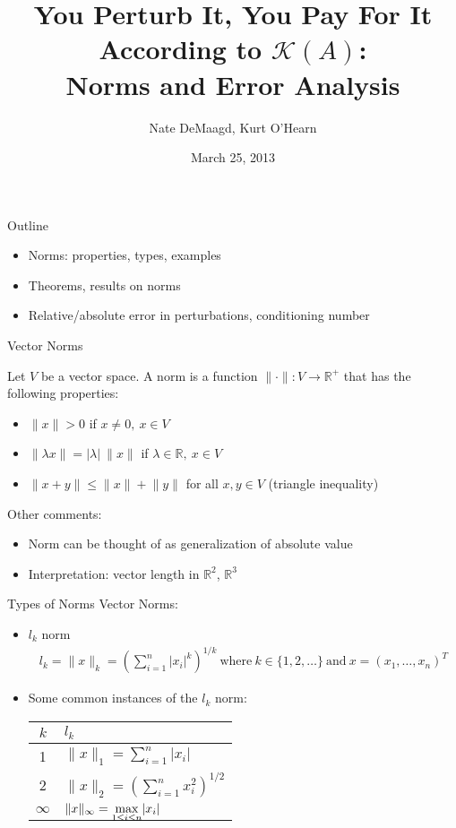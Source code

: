 \documentclass[9pt, serif]{beamer}
\title[Norms and Error Analysis]
{You Perturb It, You Pay For It According to $\mathcal{K}(A)$:\\Norms and Error Analysis}
\author[]
{Nate DeMaagd, Kurt O'Hearn}
\institute[Grand Valley State University]
{MTH 499-02}
\date{March 25, 2013}
\newlength{\wideitemsep}
\let\olditem\item
\renewcommand{\item}{\setlength{\itemsep}{\wideitemsep}\olditem}
\newcommand{\bi}{\begin{itemize}}
\newcommand{\ei}{\end{itemize}}
\newcommand{\abs}[1]{\lvert#1\rvert}
\newcommand{\norm}[1]{\lVert#1\rVert}
\begin{document}
\begin{frame}
    \titlepage
\end{frame}

\begin{frame}{Outline}
    \bi
        \item Norms: properties, types, examples \pause
        \item Theorems, results on norms \pause
        \item Relative/absolute error in perturbations, conditioning number
    \ei
\end{frame}


\begin{frame}{Vector Norms}
    \pause
    \begin{definition}
        Let $V$ be a vector space.  A norm is a function $\norm{\cdot}: V \to \mathbb{R}^+$ that
        has the following properties:
        \bi
            \item $\norm{x}>0$ if $x\neq0,~x\in V$
            \item $\norm{\lambda x} = \abs{\lambda}~\norm{x}$ if $\lambda\in\mathbb{R},~x\in V$
            \item $\norm{x+y}\leq\norm{x} + \norm{y}$ for all $x,y \in V$ (triangle inequality)
        \ei
    \end{definition} \pause
    Other comments:
\bi
    \item Norm can be thought of as generalization of absolute value
    \item Interpretation: vector length in $\mathbb{R}^2$, $\mathbb{R}^3$
\ei
\end{frame}


\begin{frame}{Types of Norms}
    \pause
    Vector Norms:
    \pause
    \bi
    \item $l_k$ norm
        \begin{align*}
            l_k = \norm{x}_k = \left(\sum\limits_{i=1}^n \abs{x_i}^k\right)^{1/k}~\text{where}~k\in\{1,2,\dots\}~\text{and}~x=(x_1,\dots,x_n)^T
        \end{align*}
    \pause

\item Some common instances of the $l_k$ norm:
\begin{table}[H]
        \centering
    \begin{tabular}{c | l}

     $k$ & $l_k$ \\
     \hline
     1 & $\norm{x}_1 = \sum\limits_{i=1}^n \abs{x_i}$ \\
     2 & $\norm{x}_2=\left(\sum\limits_{i=1}^n x_i^2\right)^{1/2}$ \\
    $\infty$ & $\norm{x}_\infty = \smash{\displaystyle\max_{1 \leq i \leq n}} \abs{x_i}$
    \end{tabular}
    \end{table}

\ei
\end{frame}
\end{document}
